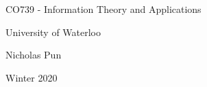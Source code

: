 \documentclass[12pt]{article}
\begin{document}
\begin{titlepage}
  \centering
  \vspace*{2in}
  {\huge CO739 - Information Theory and Applications}\par
  \vspace{0.5in}
  {\large University of Waterloo}\par
  {\large Nicholas Pun}\par
  {\large Winter 2020}\par 
 \end{titlepage}
 
\tableofcontents
\clearpage


\end{document}
